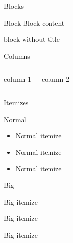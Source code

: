 \documentclass[beamer,aspectratio=169,12pt]{standalone}
\begin{document}
\begin{frame}{Blocks}

\begin{block}{Block}
Block content
\end{block}



\begin{block}{}
block without title
\end{block}



\end{frame}


\begin{frame}{Columns}

\begin{columns}

column 1

column 2

\end{columns}


\end{frame}


\begin{frame}{Itemizes}

\begin{block}{Normal}
    \begin{itemize}
        \item Normal itemize
        \item Normal itemize
        \item Normal itemize
    \end{itemize}
\end{block}



\begin{block}{Big}
    \begin{itemizebig}
        \item Big itemize
        \item Big itemize
        \item Big itemize
    \end{itemizebig}
\end{block}


\end{frame}



\end{document}
